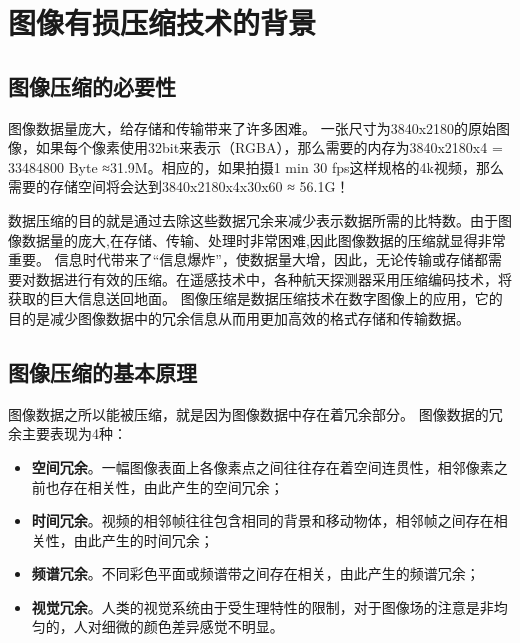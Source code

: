 \chapter{图像有损压缩技术的背景}

\section{图像压缩的必要性}

图像数据量庞大，给存储和传输带来了许多困难。
一张尺寸为3840x2180的原始图像，如果每个像素使用32bit来表示（RGBA），那么需要的内存为3840x2180x4 = 33484800 Byte ≈31.9M。相应的，如果拍摄1 min 30 fps这样规格的4k视频，那么需要的存储空间将会达到3840x2180x4x30x60 ≈ 56.1G！

数据压缩的目的就是通过去除这些数据冗余来减少表示数据所需的比特数。由于图像数据量的庞大,在存储、传输、处理时非常困难,因此图像数据的压缩就显得非常重要。
信息时代带来了“信息爆炸”，使数据量大增，因此，无论传输或存储都需要对数据进行有效的压缩。在遥感技术中，各种航天探测器采用压缩编码技术，将获取的巨大信息送回地面。
图像压缩是数据压缩技术在数字图像上的应用，它的目的是减少图像数据中的冗余信息从而用更加高效的格式存储和传输数据。


\section{图像压缩的基本原理}

图像数据之所以能被压缩，就是因为图像数据中存在着冗余部分。
图像数据的冗余主要表现为4种：
\begin{itemize}
    \item \textbf{空间冗余}。一幅图像表面上各像素点之间往往存在着空间连贯性，相邻像素之前也存在相关性，由此产生的空间冗余；
    \item \textbf{时间冗余}。视频的相邻帧往往包含相同的背景和移动物体，相邻帧之间存在相关性，由此产生的时间冗余；
    \item \textbf{频谱冗余}。不同彩色平面或频谱带之间存在相关，由此产生的频谱冗余；
    \item \textbf{视觉冗余}。人类的视觉系统由于受生理特性的限制，对于图像场的注意是非均匀的，人对细微的颜色差异感觉不明显。
\end{itemize}